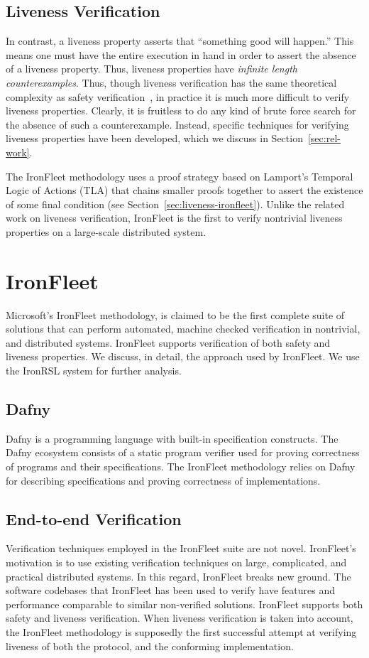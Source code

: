 \documentclass{llncs}
\begin{document}
\subsection{Liveness Verification}\label{sec:liveness-description}
In contrast, a liveness property asserts that ``something good will happen.''
This means one must have the entire execution in hand in order to assert the
absence of a liveness property. Thus, liveness properties have \textit{infinite
  length counterexamples}.  Thus, though liveness verification has the same
theoretical complexity as safety verification~\cite{simulation-liveness}, in
practice it is much more difficult to verify liveness properties. Clearly, it is
fruitless to do any kind of brute force search for the absence of such a
counterexample. Instead, specific techniques for verifying liveness properties
have been developed, which we discuss in Section~\ref{sec:rel-work}.

The IronFleet methodology uses a proof strategy based on Lamport's Temporal
Logic of Actions (TLA) that chains smaller proofs together to assert the
existence of some final condition (see
Section~\ref{sec:liveness-ironfleet}). Unlike the related work on liveness
verification, IronFleet is the first to verify nontrivial liveness properties on
a large-scale distributed system.
%
\section{IronFleet}
Microsoft's IronFleet methodology, is claimed to be the first complete suite of 
solutions that can perform automated, machine checked verification 
in nontrivial, and distributed systems. IronFleet supports 
verification of both safety and liveness properties. We discuss, in detail, the 
approach used by IronFleet. We use the IronRSL system for further analysis.

\subsection{Dafny}
Dafny is a programming language with built-in specification constructs. The Dafny
ecosystem consists of a static program verifier used for proving correctness of
programs and their specifications. The IronFleet methodology relies 
on Dafny for describing specifications and proving correctness of implementations. 

\subsection{End-to-end Verification}
Verification techniques employed in the IronFleet suite are not novel. IronFleet's 
motivation is to use existing verification techniques on large, complicated, and practical distributed
systems. In this regard, IronFleet breaks new ground. The software codebases that IronFleet
has been used to verify have features and performance comparable to similar non-verified solutions. 
IronFleet supports both safety and liveness verification. When liveness verification is taken into account, 
the IronFleet methodology is supposedly the first successful attempt at verifying liveness of both
the protocol, and the conforming implementation. 
\end{document}

